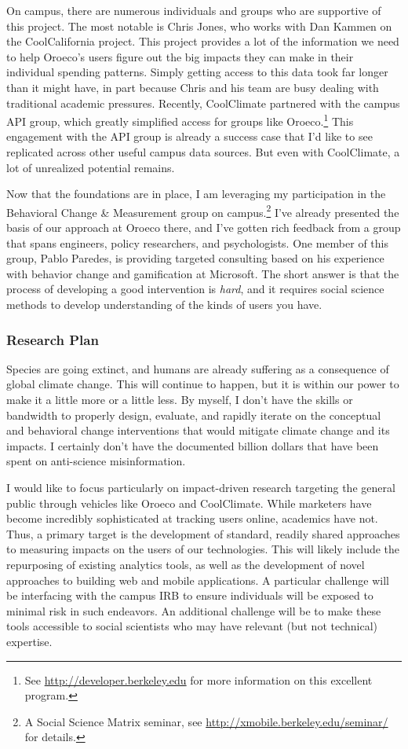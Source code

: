 On campus, there are numerous individuals and groups who are supportive of this
project.  The most notable is Chris Jones, who works with Dan Kammen on the
CoolCalifornia project.  This project provides a lot of the information we need
to help Oroeco's users figure out the big impacts they can make in their
individual spending patterns.  Simply getting access to this data took far
longer than it might have, in part because Chris and his team are busy dealing
with traditional academic pressures. Recently, CoolClimate partnered with the
campus API group, which greatly simplified access for groups like
Oroeco.\footnote{See \url{http://developer.berkeley.edu} for more information on
    this excellent program.} This engagement with the API group is already a
success case that I'd like to see replicated across other useful campus data
sources. But even with CoolClimate, a lot of unrealized potential remains.

Now that the foundations are in place, I am leveraging my participation in the
Behavioral Change \& Measurement group on campus.\footnote{A Social Science
    Matrix seminar, see \url{http://xmobile.berkeley.edu/seminar/} for details.}
I've already presented the basis of our approach at Oroeco there, and I've
gotten rich feedback from a group that spans engineers, policy researchers, and
psychologists. One member of this group, Pablo Paredes, is providing targeted
consulting based on his experience with behavior change and gamification at
Microsoft. The short answer is that the process of developing a good
intervention is \emph{hard}, and it requires social science methods to develop
understanding of the kinds of users you have.

\subsubsection*{Research Plan}

Species are going extinct, %
and humans are already suffering as a
consequence of global climate change. %
This will continue to happen, but
it is within our power to make it a little more or a little less. By myself, I
don't have the skills or bandwidth to properly design, evaluate, and rapidly
iterate on the conceptual and behavioral change interventions that would
mitigate climate change and its impacts. I certainly don't have the documented
billion dollars that have been spent on anti-science misinformation.

I would like to focus particularly on impact-driven research targeting the
general public through vehicles like Oroeco and CoolClimate. While marketers
have become incredibly sophisticated at tracking users online, academics have
not. Thus, a primary target is the development of standard, readily shared
approaches to measuring impacts on the users of our technologies. This will
likely include the repurposing of existing analytics tools, as well as the
development of novel approaches to building web and mobile applications. A
particular challenge will be interfacing with the campus IRB to ensure
individuals will be exposed to minimal risk in such endeavors. An additional
challenge will be to make these tools accessible to social scientists who may
have relevant (but not technical) expertise.

